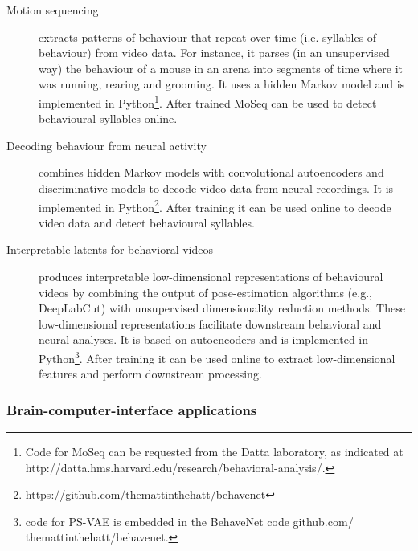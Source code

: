 \begin{description}

    \item[Motion sequencing]\citep[MoSeq;][]{wiltschkoEtAl15} extracts patterns
        of behaviour that repeat over time (i.e. syllables of behaviour) from
        video data. For instance, it parses (in an unsupervised way) the
        behaviour of a mouse in an arena into segments of time where it        was running, rearing and grooming. It uses a hidden Markov model and
        is implemented in Python\footnote{Code for MoSeq can be requested from
        the Datta laboratory, as indicated at
        http://datta.hms.harvard.edu/research/behavioral-analysis/.}.
        After trained MoSeq can be used to detect behavioural syllables online.

    \item[Decoding behaviour from neural
        activity]\citep[BehaveNet;][]{battyEtAl19} combines hidden Markov
        models with convolutional autoencoders and discriminative models to
        decode video data from neural recordings. It is implemented in
        Python\footnote{https://github.com/themattinthehatt/behavenet}.
        After training it can be used online to decode video data and detect
        behavioural syllables.

    \item[Interpretable latents for behavioral videos]\citep[Partitioned
        Subspace Variational Autoencoder, PS-VAE;][]{whitewayEtAl21} produces
        interpretable low-dimensional representations of behavioural videos by
        combining the output of pose-estimation algorithms (e.g., DeepLabCut)
        with unsupervised dimensionality reduction methods. These
        low-dimensional representations facilitate downstream behavioral and
        neural analyses. It is based on autoencoders and is implemented in
        Python\footnote{code for PS-VAE is embedded in the BehaveNet code
        github.com/ themattinthehatt/behavenet.%
        }. After training it can be used
        online to extract low-dimensional features and perform downstream
        processing.

\end{description}

\subsubsection{Brain-computer-interface applications}
\label{sec:bci}

